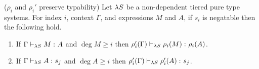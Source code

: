 \documentclass{article}
\begin{document}
\begin{lemma}
\label{lem:rho-pres-type}
($\rho_i$ and $\rho_i'$ preserve typability) Let $\lS$ be a non-dependent tiered pure type systems.
For index $i$, context $\Gamma$, and expressions $M$ and $A$, if $s_i$ is negatable then the following hold.
\begin{enumerate}
\item\label{item:rho-preserves-types-i} If $\judgment[\lS] \Gamma M A$ and $\deg M \geq i$ then $\judgment[\lS] {\rho_i'(\Gamma)} {\rho_i(M)} {\rho_i(A)}$.
\item\label{item:rho-preserves-types-ii} If $\judgment[\lS] \Gamma A {s_j}$ and $\deg A \geq i$ then $\judgment[\lS]{\rho_i'(\Gamma)} {\rho_i'(A)} {s_j}$.
\end{enumerate}
\end{lemma}
\end{document}
